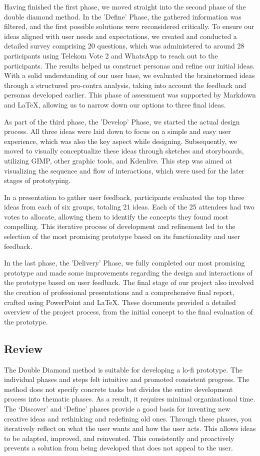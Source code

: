 \documentclass{article}
\begin{document}
Having finished the first phase, we moved straight into the second phase of the double diamond method.
In the 'Define' Phase, the gathered information was filtered, and the first possible solutions were reconsidered critically.
To ensure our ideas aligned with user needs and expectations, we created and conducted a detailed survey comprising 20 questions,
which was administered to around 28 participants using Telekom Vote 2 and WhatsApp to reach out to the participants.
The results helped us construct personas and refine our initial ideas.
With a solid understanding of our user base, we evaluated the brainstormed ideas through a structured pro-contra analysis,
taking into account the feedback and personas developed earlier.
This phase of assessment was supported by Markdown and LaTeX, allowing us to narrow down our options to three final ideas.

As part of the third phase, the 'Develop' Phase, we started the actual design process.
All three ideas were laid down to focus on a simple and easy user experience, which was also the key aspect while designing.
Subsequently, we moved to visually conceptualize these ideas through sketches and storyboards,
utilizing GIMP, other graphic tools, and Kdenlive.
This step was aimed at visualizing the sequence and flow of interactions, which were used for the later stages of prototyping.

In a presentation to gather user feedback, participants evaluated the top three ideas from each of six groups, totaling 21 ideas.
Each of the 25 attendees had two votes to allocate, allowing them to identify the concepts they found most compelling.
This iterative process of development and refinement led to the selection of the most promising prototype
based on its functionality and user feedback.

In the last phase, the 'Delivery' Phase, we fully completed our most promising prototype
and made some improvements regarding the design and interactions of the prototype based on user feedback.
The final stage of our project also involved the creation of professional presentations and a comprehensive final report,
crafted using PowerPoint and LaTeX. These documents provided a detailed overview of the project process,
from the initial concept to the final evaluation of the prototype.

\subsection{Review}
The Double Diamond method is suitable for developing a lo-fi prototype.
The individual phases and steps felt intuitive and promoted consistent progress.
The method does not specify concrete tasks but divides the entire development process into thematic phases.
As a result, it requires minimal organizational time.
The ‘Discover’ and ‘Define’ phases provide a good basis for inventing new creative ideas and rethinking and redefining old ones.
Through these phases, you iteratively reflect on what the user wants and how the user acts.
This allows ideas to be adapted, improved, and reinvented.
This consistently and proactively prevents a solution from being developed that does not appeal to the user.
\end{document}

